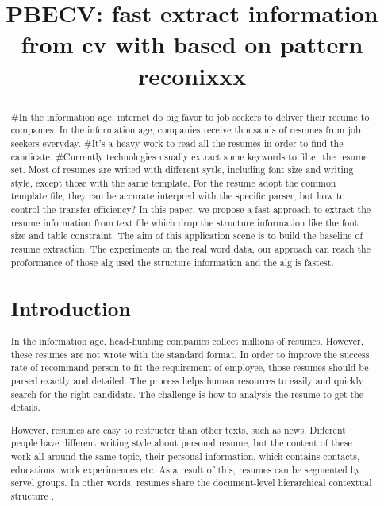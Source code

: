 

\title{PBECV: fast extract information from cv with based on pattern reconixxx}

\maketitle

\begin{abstract}

#In the information age, internet do big favor to job seekers to deliver their resume to companies. 
In the information age, companies receive thousands of resumes from job seekers everyday. 
#It's  a heavy work to read all the resumes in order to find the candicate.
#Currently technologies usually extract some keywords to filter the resume set.
Most of resumes are writed with different sytle, including font size and writing style, except those with the same template.
For the resume adopt the common template file, they can be accurate interpred with the specific parser, but how to control the transfer efficiency?
In this paper, we propose a fast approach to extract the resume information from text file which drop the structure information like the font size and table constraint.
The aim of this application scene is to build the baseline of resume extraction.
The experiments on the real word data, our approach can reach the proformance of those alg used the structure information and the alg is fastest.

\section{Introduction}

In the information age, head-hunting companies collect millions of resumes. 
However, these resumes are not wrote with the standard format.
In order to improve the success rate of recommand person to fit the requirement of employee, those resumes should be parsed exactly and detailed.
The process helps human resources to easily and quickly search for the right candidate.
The challenge is how to analysis the resume to get the details.

However, resumes are easy to restructer than other texts, such as news. 
Different people have different writing style about personal resume, but the content of these work all around the same topic, their personal information, which contains contacts, educations, work experimences etc.
As a result of this, resumes can be segmented by servel groups.
In other words, resumes share the document-level hierarchical contextual structure \cite{maheshwari2010approach}.


\end{abstract}
